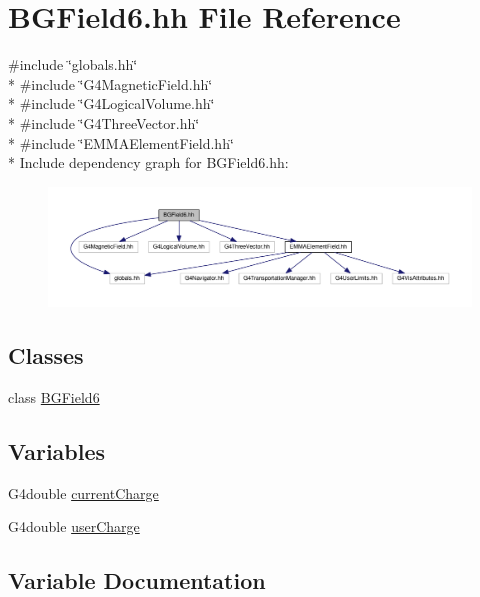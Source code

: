 \hypertarget{BGField6_8hh}{}\section{B\+G\+Field6.\+hh File Reference}
\label{BGField6_8hh}
{\ttfamily \#include \char`\"{}globals.\+hh\char`\"{}}\\*
{\ttfamily \#include \char`\"{}G4\+Magnetic\+Field.\+hh\char`\"{}}\\*
{\ttfamily \#include \char`\"{}G4\+Logical\+Volume.\+hh\char`\"{}}\\*
{\ttfamily \#include \char`\"{}G4\+Three\+Vector.\+hh\char`\"{}}\\*
{\ttfamily \#include \char`\"{}E\+M\+M\+A\+Element\+Field.\+hh\char`\"{}}\\*
Include dependency graph for B\+G\+Field6.\+hh\+:
\nopagebreak
\begin{figure}[H]
\begin{center}
\leavevmode
\includegraphics[width=350pt]{BGField6_8hh__incl}
\end{center}
\end{figure}
\subsection*{Classes}
\begin{DoxyCompactItemize}
\item 
class \hyperlink{classBGField6}{B\+G\+Field6}
\end{DoxyCompactItemize}
\subsection*{Variables}
\begin{DoxyCompactItemize}
\item 
G4double \hyperlink{BGField6_8hh_acb265d8eecfa1acd31056f0c7915362e}{current\+Charge}
\item 
G4double \hyperlink{BGField6_8hh_a2d61cdd1b1b5ed409f7c91b54737c1b9}{user\+Charge}
\end{DoxyCompactItemize}


\subsection{Variable Documentation}
